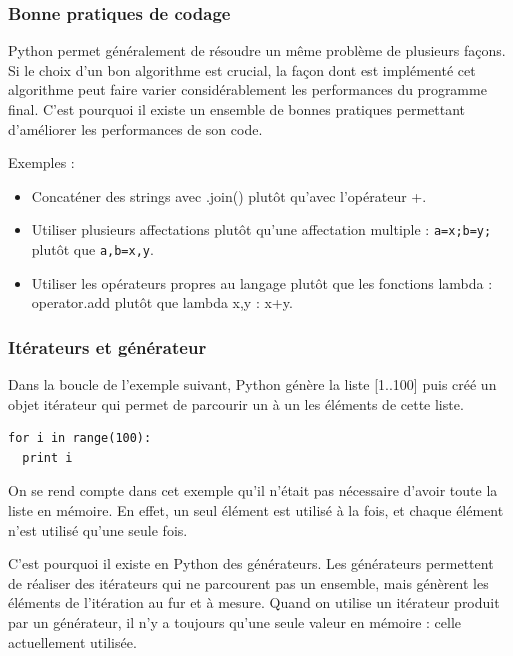 \documentclass[a4paper]{article}
\begin{document}
\label{OptCode}

\subsubsection{Bonne pratiques de codage}

Python permet généralement de résoudre un même problème de plusieurs
façons. Si le choix d'un bon algorithme est crucial, la façon dont est
implémenté cet algorithme peut faire varier considérablement les
performances du programme final. C'est pourquoi il existe un ensemble
de bonnes pratiques permettant d'améliorer les performances de son
code\cite{PythonSpeed}.


Exemples :
\begin{itemize}
\item Concaténer des strings avec .join() plutôt qu'avec l'opérateur +.
\item Utiliser plusieurs affectations plutôt qu'une affectation
  multiple : \lstinline|a=x;b=y;| plutôt que \lstinline|a,b=x,y|.
\item Utiliser les opérateurs propres au langage plutôt que les
  fonctions lambda : operator.add plutôt que lambda x,y : x+y.
\end{itemize}

\subsubsection{Itérateurs et générateur}

Dans la boucle de l'exemple suivant, Python génère la liste [1..100]
puis créé un objet itérateur qui permet de parcourir un à un les
éléments de cette liste.

\begin{lstlisting}
for i in range(100):
  print i
\end{lstlisting}

On se rend compte dans cet exemple qu'il n'était pas nécessaire
d'avoir toute la liste en mémoire. En effet, un seul élément est
utilisé à la fois, et chaque élément n'est utilisé qu'une seule fois.

C'est pourquoi il existe en Python des générateurs. Les générateurs
permettent de réaliser des itérateurs qui ne parcourent pas un
ensemble, mais génèrent les éléments de l'itération au fur et à
mesure. Quand on utilise un itérateur produit par un générateur, il
n'y a toujours qu'une seule valeur en mémoire : celle actuellement
utilisée.
\end{document}
